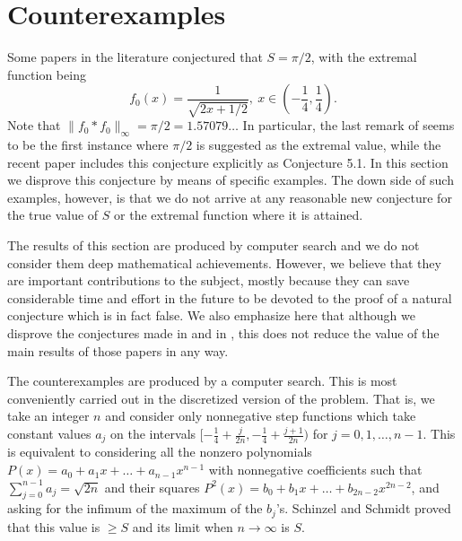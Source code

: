 \documentclass[12pt]{amsart}
\theoremstyle{definition}
\begin{document}
\section{Counterexamples}\label{examples}

Some papers in the literature conjectured that $S=\pi/2$, with the
extremal function being
$$f_0(x)=\frac{1}{\sqrt{2x+1/2}},\ x \in \left(-\frac{1}{4}, \frac{1}{4} \right).$$
Note that $\|f_0\ast f_0\|_\infty=\pi/2=1.57079\dots$ In particular, the
last remark of \cite{sch} seems to be the first instance where
$\pi/2$ is suggested as the extremal value, while the recent paper
\cite{martin} includes this conjecture explicitly as Conjecture 5.1.
In this section we disprove this conjecture by means of specific
examples. The down side of such examples, however, is that we do
not arrive at any reasonable new conjecture for the true value
of $S$ or the extremal function where it is attained.

\medskip

The results of this section are produced by computer search and we
do not consider them deep mathematical achievements. However, we
believe that they are important contributions to the subject,
mostly because they can save considerable time and effort in the
future to be devoted to the proof of a natural conjecture which is
in fact false. We also emphasize here that although we disprove
the conjectures made in \cite{sch} and in \cite{martin}, this does
not reduce the value of the main results of those papers in any
way.

\medskip

The counterexamples are produced by a computer search. This is
most conveniently carried out in the discretized version of the
problem. That is, we take an integer $n$ and consider only
nonnegative step functions which take constant values $a_j$ on the
intervals $[-\frac{1}{4}+\frac{j}{2n}, -\frac{1}{4}+\frac{j+1}{2n})$
for $j=0, 1, \dots, n-1$. This is equivalent to considering all the nonzero polynomials $P(x)=a_0+a_1x+\dots+
a_{n-1}x^{n-1}$ with nonnegative coefficients such that $\sum_{j=0}^{n-1}a_j=\sqrt{2n}$ and their squares
$P^2(x)=b_0+b_1x+\dots + b_{2n-2}x^{2n-2}$, and asking for the infimum of the
maximum of the $b_j$'s. Schinzel and Schmidt proved \cite{sch} that this value is $\ge S$ and its limit when
$n \to \infty$ is $S$.
\end{document}
